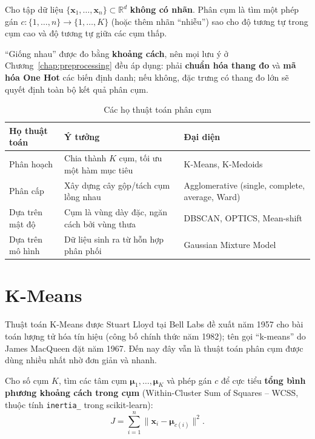 \begin{definition}
Cho tập dữ liệu $\{\mathbf{x}_1, \dots, \mathbf{x}_n\} \subset \mathbb{R}^d$ \textbf{không có nhãn}. Phân cụm là tìm một phép gán $c: \{1, \dots, n\} \to \{1, \dots, K\}$ (hoặc thêm nhãn ``nhiễu'') sao cho độ tương tự trong cụm cao và độ tương tự giữa các cụm thấp.
\end{definition}

``Giống nhau'' được đo bằng \textbf{khoảng cách}, nên mọi lưu ý ở Chương~\ref{chap:preprocessing} đều áp dụng: phải \textbf{chuẩn hóa thang đo} và \textbf{mã hóa One Hot} các biến định danh; nếu không, đặc trưng có thang đo lớn sẽ quyết định toàn bộ kết quả phân cụm.

\begin{table}[H]
\centering
\begin{tabular}{|p{3cm}|p{5.5cm}|p{4.5cm}|}
\hline
\textbf{Họ thuật toán} & \textbf{Ý tưởng} & \textbf{Đại diện} \\
\hline
Phân hoạch & Chia thành $K$ cụm, tối ưu một hàm mục tiêu & K-Means, K-Medoids \\ \hline
Phân cấp & Xây dựng cây gộp/tách cụm lồng nhau & Agglomerative (single, complete, average, Ward) \\ \hline
Dựa trên mật độ & Cụm là vùng dày đặc, ngăn cách bởi vùng thưa & DBSCAN, OPTICS, Mean-shift \\ \hline
Dựa trên mô hình & Dữ liệu sinh ra từ hỗn hợp phân phối & Gaussian Mixture Model \\ \hline
\end{tabular}
\caption{Các họ thuật toán phân cụm}
\end{table}

\section{K-Means}

Thuật toán K-Means được Stuart Lloyd tại Bell Labs đề xuất năm 1957 cho bài toán lượng tử hóa tín hiệu (công bố chính thức năm 1982); tên gọi ``k-means'' do James MacQueen đặt năm 1967. Đến nay đây vẫn là thuật toán phân cụm được dùng nhiều nhất nhờ đơn giản và nhanh.

\begin{definition}
Cho số cụm $K$, tìm các tâm cụm $\boldsymbol{\mu}_1, \dots, \boldsymbol{\mu}_K$ và phép gán $c$ để cực tiểu \textbf{tổng bình phương khoảng cách trong cụm} (Within-Cluster Sum of Squares -- WCSS, thuộc tính \texttt{inertia\_} trong scikit-learn):
\begin{equation}
    J = \sum_{i=1}^{n} \big\|\mathbf{x}_i - \boldsymbol{\mu}_{c(i)}\big\|^2 .
\end{equation}
\end{definition}

